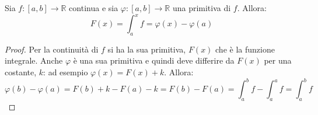 \documentclass[a4paper,12pt, oneside]{book}
\begin{document}
\newpage
\begin{teorema}
	Sia $f:[a,b]\rightarrow\mathbb{R}$ continua e sia $\varphi:[a,b]\rightarrow\mathbb{R}$ una primitiva di $f$. Allora:
	$$F(x)=\int_a^x f=\varphi(x)-\varphi(a)$$
\end{teorema}
\begin{proof}
	Per la continuità di $f$ si ha la sua primitiva, $F(x)$ che è la funzione integrale. Anche $\varphi$ è una sua primitiva e quindi deve differire da $F(x)$ per una costante, $k$: ad esempio $\varphi(x)=F(x)+k$. Allora:
	$$ \varphi(b)-\varphi(a)=F(b)+k-F(a)-k=F(b)-F(a)=\int_a^b f-\int_a^af=\int_a^bf$$
\end{proof}
\end{document}
